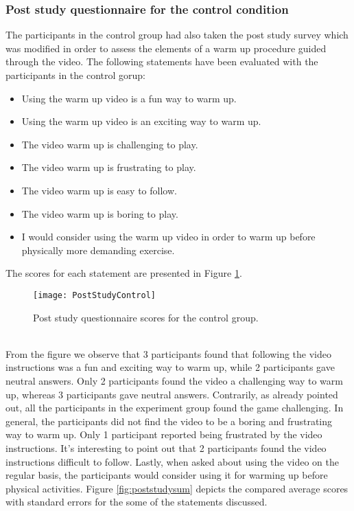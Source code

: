 \subsubsection{Post study questionnaire for the control condition} 
The participants in the control group had also taken the post study survey which was modified in order to assess the elements of a warm up procedure guided through the video. The following statements have been evaluated with the participants in the control gorup:
\begin{itemize}
\item Using the warm up video is a fun way to warm up.
\item Using the warm up video is an exciting way to warm up.
\item The video warm up is challenging to play.
\item The video warm up is frustrating to play.
\item The video warm up is easy to follow.
\item The video warm up is boring to play.
\item I would consider using the warm up video in order to warm up before physically more demanding exercise.
\end{itemize}
The scores for each statement are presented in Figure \ref{fig:poststudycontrol}.\\
\begin{figure}[h]
    \centering
    \texttt{[image: PostStudyControl]}
    \caption{Post study questionnaire scores for the control group.}
    \label{fig:poststudycontrol}
\end{figure}\\
From the figure we observe that 3 participants found that following the video instructions was a fun and exciting way to warm up, while 2 participants gave neutral answers. Only 2 participants found the video a challenging way to warm up, whereas 3 participants gave neutral answers. Contrarily, as already pointed out, all the participants in the experiment group found the game challenging. In general, the participants did not find the video to be a boring and frustrating way to warm up. Only 1 participant reported being frustrated by the video instructions. It's interesting to point out that 2 participants found the video instructions difficult to follow. Lastly, when asked about using the video on the regular basis, the participants would consider using it for warming up before physical activities. Figure \ref{fig:poststudysum} depicts the compared average scores with standard errors for the some of the statements discussed.\pagebreak

